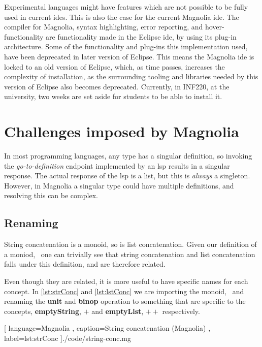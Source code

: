 Experimental languages might have features which are not possible to be fully
used in current \gls*{ide}s. This is also the case for the current Magnolia
\gls*{ide}. The compiler for Magnolia, syntax highlighting, error reporting, and
hover-functionality are functionality made in the Eclipse \gls*{ide}, by using
its plug-in architecture. Some of the functionality and plug-ins this
implementation used, have been deprecated in later version of Eclipse. This
means the Magnolia \gls*{ide} is locked to an old version of Eclipse, which, as
time passes, increases the complexity of installation, as the surrounding
tooling and libraries needed by this version of Eclipse also becomes deprecated.
Currently, in INF220, at the university, two weeks are set aside for students to
be able to install it.

\section{Challenges imposed by Magnolia}

In most programming languages, any type has a singular definition, so invoking
the \textit{go-to-definition} endpoint implemented by an \gls*{lsp} results in a
singular response. The actual response of the \gls*{lsp} is a list, but this is
\textit{always} a singleton. However, in Magnolia a singular type could have
multiple definitions, and resolving this can be complex.

\subsection{Renaming}

String concatenation is a monoid, so is list concatenation.
Given our definition of a moniod,~\footnotemark{} one can
trivially see that string concatenation and list concatenation falls under this
definition, and are therefore related.

Even though they are related, it is more useful to have specific names for each
concept. In \ref{lst:strConc} and \ref{lst:lstConc} we are importing the
monoid,~\footnotemark{} and renaming the \textbf{unit} and \textbf{binop}
operation to something that are specific to the concepts, \textbf{emptyString},
$+$ and \textbf{emptyList}, $++$ respectively.


\begin{center}
  
    [ language=Magnolia
    , caption={String concatenation (Magnolia)}
    , label=lst:strConc
    ]{./code/string-conc.mg}
\end{center}

